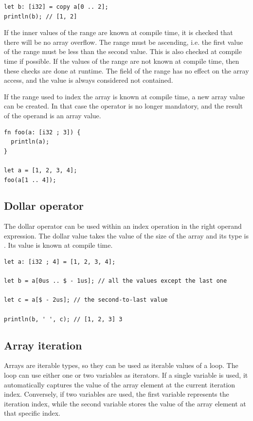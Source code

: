 \begin{itemize}
\begin{lstlisting}[style=coloredverbatim]
let b: [i32] = copy a[0 .. 2];
println(b); // [1, 2]
  \end{lstlisting}

  If the inner values of the range are known at compile time, it is checked that
  there will be no array overflow. The range must be ascending, i.e. the first
  value of the range must be less than the second value. This is also checked at
  compile time if possible. If the values of the range are not known at compile
  time, then these checks are done at runtime. The  field of the range
  has no effect on the array access, and the  value is always
  considered not contained.

  If the range used to index the array is known at compile time, a new array
  value can be created. In that case the  operator is no longer
  mandatory, and the result of the operand is an array value.

  \begin{lstlisting}[style=coloredverbatim]
fn foo(a: [i32 ; 3]) {
  println(a);
}

let a = [1, 2, 3, 4];
foo(a[1 .. 4]);
  \end{lstlisting}

\end{itemize}

\subsection{Dollar operator}

The dollar operator can be used within an index operation in the right operand
expression. The dollar value takes the value of the size of the array and its
type is . Its value is known at compile time.

\begin{lstlisting}[style=coloredverbatim]
let a: [i32 ; 4] = [1, 2, 3, 4];

let b = a[0us .. $ - 1us]; // all the values except the last one

let c = a[$ - 2us]; // the second-to-last value

println(b, ' ', c); // [1, 2, 3] 3
\end{lstlisting}

\subsection{Array iteration}

Arrays are iterable types, so they can be used as iterable values of a
 loop. The  loop can use either one or two variables as
iterators. If a single variable is used, it automatically captures the value of
the array element at the current iteration index. Conversely, if two variables
are used, the first variable represents the iteration index, while the second
variable stores the value of the array element at that specific index.

